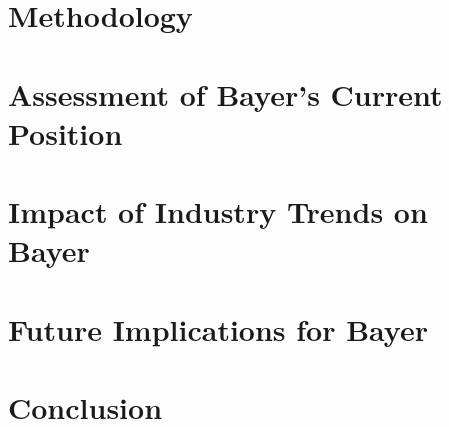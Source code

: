 \chapter{Methodology}
\chapter{Assessment of Bayer's Current Position}
\chapter{Impact of Industry Trends on Bayer}
\chapter{Future Implications for Bayer}
\chapter{Conclusion}